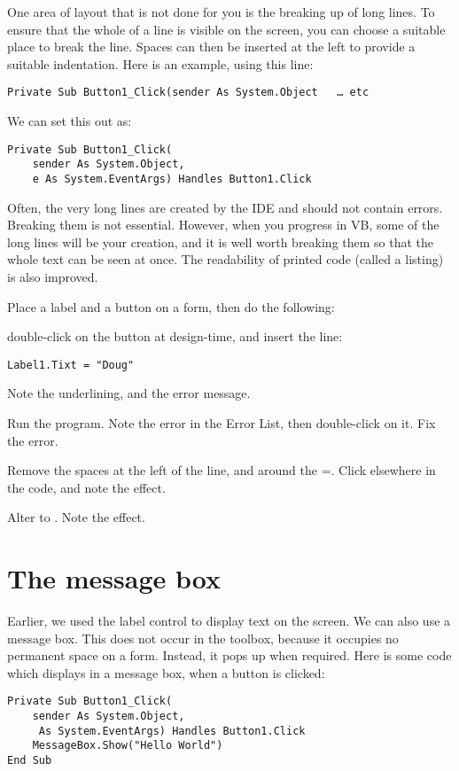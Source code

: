 		One area of layout that is not done for you is the breaking up of long lines. To ensure that the whole of a line is visible on the screen, you can choose a suitable place to break the line. Spaces can then be inserted at the left to provide a suitable indentation. Here is an example, using this line:
		\begin{lstlisting}
Private Sub Button1_Click(sender As System.Object	… etc
		\end{lstlisting}
		We can set this out as:
		\begin{lstlisting}
Private Sub Button1_Click( 
	sender As System.Object, 
	e As System.EventArgs) Handles Button1.Click
		\end{lstlisting}
		Often, the very long lines are created by the IDE and should not contain errors. Breaking them is not essential. However, when you progress in VB, some of the 
long lines will be your creation, and it is well worth breaking them so that the whole text can be seen at once. The readability of printed code (called a listing) is also improved.

	\begin{stqb}
			\begin{STQ}
				\item	Place a label and a button on a form, then do the following:
					\begin{enumAlph}
						\item double-click on the button at design-time, and insert the line:
							\begin{lstlisting}
Label1.Tixt = "Doug"
							\end{lstlisting}
							Note the underlining, and the error message.
						\item Run the program. Note the error in the Error List, then double-click on it. Fix the error.
						\item Remove the spaces at the left of the line, and around the =. Click elsewhere in the code, and note the effect.
						\item Alter  to . Note the effect.
					\end{enumAlph}
			\end{STQ}
		\end{stqb}

	\section{The message box}
		Earlier, we used the label control to display text on the screen. We can also use a message box. This does not occur in the toolbox, because it occupies no permanent space on a form. Instead, it pops up when required. Here is some code which displays  in a message box, when a button is clicked:
			\begin{lstlisting}
Private Sub Button1_Click(
	sender As System.Object,
	 As System.EventArgs) Handles Button1.Click
	MessageBox.Show("Hello World")
End Sub
			\end{lstlisting}


